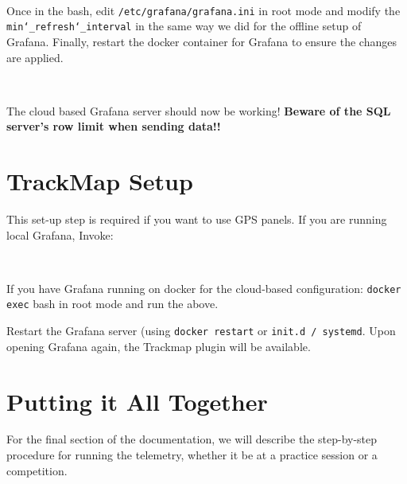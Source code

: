 \documentclass[12pt, letterpaper]{article}
\begin{document}
{{{{{{{{{{{{	\par{} \\
	
	\par Once in the bash, edit \texttt{/etc/grafana/grafana.ini} in root mode and modify the \texttt{min\char`_refresh\char`_interval} in the same way we did for the offline setup of Grafana. Finally, restart the docker container for Grafana to ensure the changes are applied. \\
	
	\par{} \\

\par The cloud based Grafana server should now be working! \textbf{Beware of the SQL server's row limit when sending data!!}



\section {TrackMap Setup} 

This set-up step is required if you want to use GPS panels. If you are running local Grafana, Invoke: \\
 
  \par{} \\
 
\par If you have Grafana running on docker for the cloud-based configuration: \texttt{docker exec} bash in root mode and run the above. \\
\par Restart the Grafana server (using \texttt{docker restart} or \texttt{init.d / systemd}. Upon opening Grafana again, the Trackmap plugin will be available.  

\section {Putting it All Together}

\par For the final section of the documentation, we will describe the step-by-step procedure for running the telemetry, whether it be at a practice session or a competition.

}}}}}}}}}}}}
\end{document}
